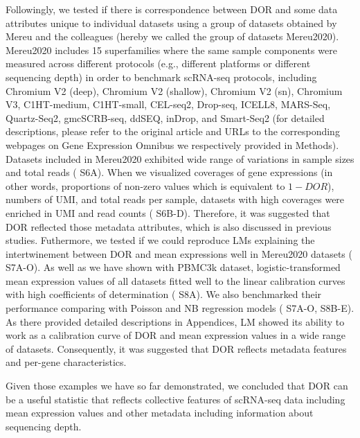 \documentclass{article}
\begin{document}
Followingly, we tested if there is correspondence between DOR and some data attributes unique to individual 
datasets using a group of datasets obtained by Mereu and the colleagues\cite{mereu2020benchmarking} (hereby we called the group of 
datasets Mereu2020). Mereu2020 includes 15 superfamilies where the same sample components were measured 
across different protocols (e.g., different platforms or different sequencing depth) in order to benchmark scRNA-seq 
protocols\cite{mereu2020benchmarking}, including Chromium V2 (deep), Chromium V2 (shallow), Chromium V2 (sn), Chromium V3, C1HT-medium, 
C1HT-small, CEL-seq2, Drop-seq, ICELL8, MARS-Seq, Quartz-Seq2, gmcSCRB-seq, ddSEQ, inDrop, 
and Smart-Seq2 (for detailed descriptions, please refer to the original article\cite{mereu2020benchmarking} and URLs to the corresponding 
webpages on Gene Expression Omnibus we respectively provided in Methods). Datasets included in Mereu2020 
exhibited wide range of variations in sample sizes and total reads (\figurename{ S6A}). When we visualized coverages 
of gene expressions (in other words, proportions of non-zero values which is equivalent to $1-DOR$), numbers 
of \ac{UMI}, and total reads per sample, datasets with high coverages were enriched in 
UMI and read counts (\figurename{ S6B-D}). Therefore, it was suggested that DOR reflected those metadata attributes, 
which is also discussed in previous studies\cite{qiu2020embracing, zappia2017splatter}. Futhermore, we tested if we could reproduce LMs explaining the 
intertwinement between DOR and mean expressions well in Mereu2020 datasets (\figurename{ S7A-O}). As well as we have 
shown with PBMC3k dataset, logistic-transformed mean expression values of all datasets fitted well to the linear 
calibration curves with high coefficients of determination (\figurename{ S8A}). We also benchmarked their performance 
comparing with Poisson and NB regression models (\figurename{ S7A-O, S8B-E}). As there provided detailed descriptions 
in Appendices, LM showed its ability to work as a calibration curve of DOR and mean expression values in a wide 
range of datasets. Consequently, it was suggested that DOR reflects metadata features and per-gene characteristics.

Given those examples we have so far demonstrated, we concluded that DOR can be a useful statistic that reflects 
collective features of scRNA-seq data including mean expression values and other metadata including information 
about sequencing depth.
\end{document}
